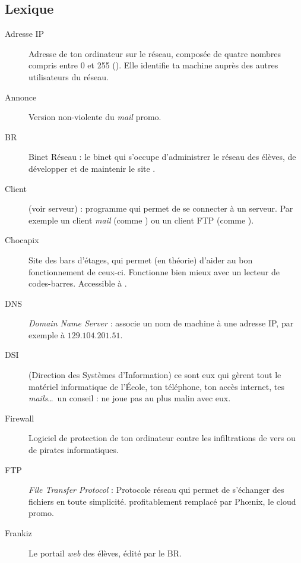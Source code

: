 \subsection{Lexique}


\begin{description}
  \item[Adresse IP] Adresse de ton ordinateur sur le réseau, composée de quatre nombres compris entre 0 et 255  (). Elle identifie ta machine auprès des autres utilisateurs du réseau.
  
  \item[Annonce] Version non-violente du \emph{mail} promo.
  
  \item[BR] Binet Réseau : le binet qui s'occupe d'administrer le réseau des élèves, de développer et de maintenir le site .

  \item[Client] (voir serveur) : programme qui permet de se connecter à un serveur. Par exemple un client \emph{mail}
	(comme ) ou un client FTP (comme ).

  \item[Chocapix] Site des bars d'étages, qui permet (en théorie) d'aider au bon fonctionnement de ceux-ci. Fonctionne bien mieux avec un lecteur de codes-barres. Accessible à .
  
  \item[DNS] \emph{Domain Name Server} : associe un nom de machine à une adresse IP, par exemple  à  $129.104.201.51$.
  
  \item[DSI] (Direction des Systèmes d'Information) ce sont eux qui gèrent tout le matériel informatique de l'École, ton téléphone, ton accès internet, tes \emph{mails}\ldots\ un conseil : ne joue pas au plus malin avec eux.

  \item[Firewall] Logiciel de protection de ton ordinateur contre les infiltrations de vers ou de pirates informatiques.
  
  \item[FTP] \emph{File Transfer Protocol} : Protocole réseau qui permet de s'échanger des fichiers en toute simplicité. profitablement remplacé par Phœnix, le cloud promo.

  \item[Frankiz] Le portail \emph{web} des élèves, édité par le BR.
  

\end{description}
